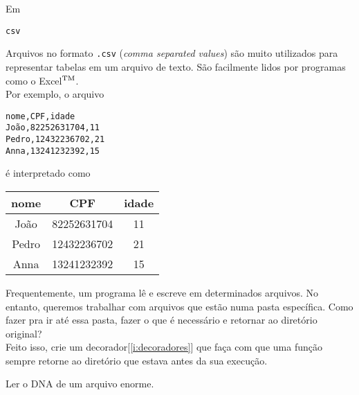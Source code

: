 \documentclass[12pt]{article}
\begin{document}
	\quest Em
	
	
	
	\begin{interlude}{\texttt{csv}}
	
	Arquivos no formato \texttt{.csv} (\textit{comma separated values}) são muito utilizados para representar tabelas em um arquivo de texto. São facilmente lidos por programas como o Excel$^{\tiny \text{TM}}$.\\
	
	Por exemplo, o arquivo
	
	\begin{lstlisting}
nome,CPF,idade
João,82252631704,11
Pedro,12432236702,21
Anna,13241232392,15
	\end{lstlisting}
	
	é interpretado como
	
	\begin{center}
	\begin{tabular}{|c|c|c|}
	\hline
	nome  & CPF         & idade\\
	\hline 
	João  & 82252631704 &11\\
	\hline
	Pedro & 12432236702 &21\\
	\hline
	Anna  & 13241232392 &15\\
	\hline
	\end{tabular}
	\end{center}
	
	\end{interlude}
	
	
	Frequentemente, um programa lê e escreve em determinados arquivos. No entanto, queremos trabalhar com arquivos que estão numa pasta específica. Como fazer pra ir até essa pasta, fazer o que é necessário e retornar ao diretório original?\\
	
	\quest Feito isso, crie um decorador[\ref{i:decoradores}] que faça com que uma função sempre retorne ao diretório que estava antes da sua execução.
	
	\label{p:dna2}
	
	Ler o DNA de um arquivo enorme.
\end{document}
